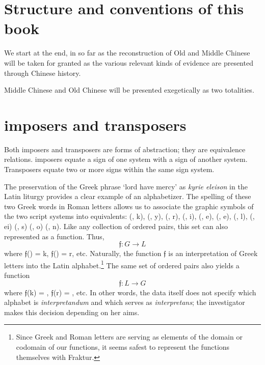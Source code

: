 \section{Structure and conventions of this book}
We start at the end, in so far as the reconstruction of Old and Middle Chinese will be taken for granted as the various relevant kinds of evidence are presented through Chinese history. 

Middle Chinese and Old Chinese will be presented exegetically as two totalities.  





\section{imposers and transposers}

Both imposers and transposers are forms of abstraction; they are equivalence relations. imposers equate a sign of one system with a sign of another system. Transposers equate two or more signs within the same sign system. 

The preservation of the Greek phrase 
{} `lord have mercy'
 as \textit{kyrie eleison} 
  in the Latin liturgy 
 provides a clear example of an alphabetizer. The spelling of these two Greek words in Roman letters allows us to associate the graphic symbols of the two script systems into equivalents: 
 ({}, k), 
 ({}, y), 
 ({}, r), 
 ({}, i), 
 ({}, e), 
 ({}, e), 
 ({}, l), 
 ({}, ei)
 ({}, s)
 ({}, o)
 ({}, n). 
Like any collection of ordered pairs, this set can also represented as a function. 
Thus, 
\begin{equation}
\mathfrak{f}: G \longrightarrow L 
\end{equation}
where 
$\mathfrak{f}$({}) = k, $\mathfrak{f}$({}) = r, etc.  
Naturally, the function 
$\mathfrak{f}$
is an interpretation of Greek letters into the Latin alphabet.\footnote{Since Greek and Roman letters are serving as elements of the domain or codomain of our functions, it seems safest to represent the functions themselves with Fraktur.} The same set of ordered pairs also yields a function 
\begin{equation}
\mathfrak{f}: L \longrightarrow G 
\end{equation}
where 
$\mathfrak{f}$(k) = {}, 
$\mathfrak{f}$(r) = {}, etc.  
In other words, the data itself does not specify which alphabet is \textit{interpretandum} and which serves as \textit{interpretans}; the investigator makes this decision depending on her aims. 

